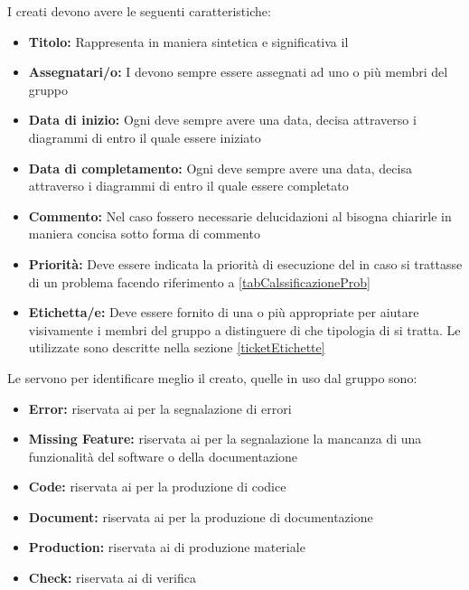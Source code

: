 \documentclass[12pt,a4paper]{article}
\begin{document}
\label{ticketStruttura}
I  creati devono avere le seguenti caratteristiche:
\begin{itemize}
	\item \textbf{Titolo:} Rappresenta in maniera sintetica e significativa il 
	\item \textbf{Assegnatari/o:} I  devono sempre essere assegnati ad uno o più membri del gruppo
	\item \textbf{Data di inizio:} Ogni  deve sempre avere una data, decisa attraverso i diagrammi di  entro il quale essere iniziato
	\item \textbf{Data di completamento:} Ogni  deve sempre avere una data, decisa attraverso i diagrammi di  entro il quale essere completato
	\item \textbf{Commento:} Nel caso fossero necessarie delucidazioni al  bisogna chiarirle in maniera concisa sotto forma di commento
	\item \textbf{Priorità:} Deve essere indicata la priorità di esecuzione del  in caso si trattasse di un problema facendo riferimento a \ref{tabCalssificazioneProb}
	\item \textbf{Etichetta/e:} Deve essere fornito di una o più appropriate  per aiutare visivamente i membri del gruppo a distinguere di che tipologia di  si tratta.	Le  utilizzate sono descritte nella sezione \ref{ticketEtichette}
\end{itemize}

\label{ticketEtichette}
Le  servono per identificare meglio il  creato, quelle in uso dal gruppo sono:
\begin{itemize}
	\item \textbf{Error:} riservata ai  per la segnalazione di errori
	\item \textbf{Missing Feature:} riservata ai  per la segnalazione la mancanza di una funzionalità del software o della documentazione
	\item \textbf{Code:} riservata ai  per la produzione di codice
	\item \textbf{Document:} riservata ai  per la produzione di documentazione
	\item \textbf{Production:} riservata ai  di produzione materiale
	\item \textbf{Check:} riservata ai  di verifica
\end{itemize}
\end{document}
